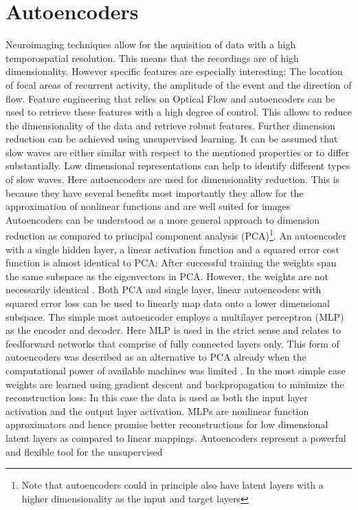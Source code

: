 \section{Autoencoders}
Neuroimaging techniques allow for the aquisition of data with a high temporospatial resolution. This means that the recordings are of high dimensionality. However specific features are especially interesting: The location of focal areas of recurrent activity, the amplitude of the event and the direction of flow. Feature engineering that relies on Optical Flow and autoencoders can be used to retrieve these features with a high degree of control. This allows to reduce the dimensionality of the data and retrieve robust features. Further dimension reduction can be achieved using unsupervised learning. It can be assumed that slow waves are either similar with respect to the mentioned properties or to differ substantially. Low dimensional representations can help to identify different types of slow waves. Here autoencoders are used for dimensionality reduction. This is because they have several benefits most importantly they allow for the approximation of nonlinear functions and are well suited for images\\
Autoencoders can be understood as a more general approach to dimension reduction as compared to principal component analysis (PCA)\footnote{Note that autoencoders could in principle also have latent layers with a higher dimensionality as the input and target layers}. An autoencoder with a single hidden layer, a linear activation function and a squared error cost function is almost identical to PCA: After successful training the weights span the same subspace as the eigenvectors in PCA. However, the weights are not necessarily identical \parencite{plaut2018principal}. Both PCA and single layer, linear autoencoders with squared error loss can be used to linearly map data onto a lower dimensional subspace.
The simple most autoencoder employs a multilayer perceptron (MLP) as the encoder and decoder. Here MLP is used in the strict sense and relates to feedforward networks that comprise of fully connected layers only. This form of autoencoders was described as an alternative to PCA already when the computational power of available machines was limited \parencite{kramer1991nonlinear}. In the most simple case weights are learned using gradient descent and backpropagation to minimize the reconstruction loss: In this case the data is used as both the input layer activation and the output layer activation. MLPs are nonlinear function approximators and hence promise better reconstructions for low dimensional latent layers as compared to linear mappings. Autoencoders represent a powerful and flexible tool for the unsupervised
